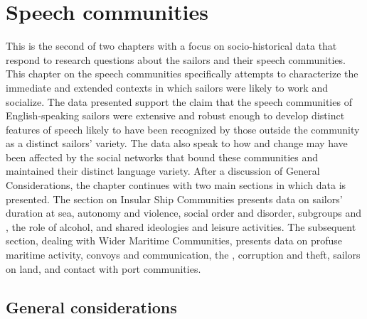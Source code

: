 \chapter{{Speech communities}}

This is the second of two chapters with a focus on socio-historical data that respond to research questions about the sailors and their speech communities. This chapter on the speech communities specifically attempts to characterize the immediate and extended contexts in which sailors were likely to work and socialize. The data presented support the claim that the speech communities of English-speaking sailors were extensive and robust enough to develop distinct features of speech likely to have been recognized by those outside the community as a distinct sailors’ variety. The data also speak to how  and change may have been affected by the social networks that bound these communities and maintained their distinct language variety. After a discussion of General Considerations, the chapter continues with two main sections in which data is presented. The section on Insular Ship Communities presents data on sailors’ duration at sea, autonomy and violence, social order and disorder, subgroups and , the role of alcohol, and shared ideologies and leisure activities. The subsequent section, dealing with Wider Maritime Communities, presents data on profuse maritime activity, convoys and communication, the , corruption and theft, sailors on land, and contact with port communities. 

\section{{General considerations}}\label{sec:4.1}

